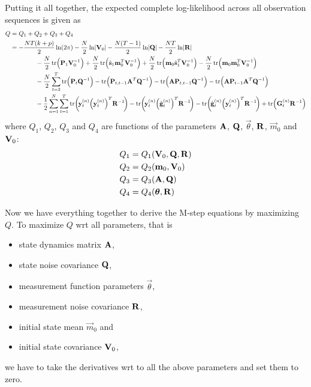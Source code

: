	Putting it all together, the expected complete log-likelihood across all observation sequences is given as
	\begin{align*}
		Q
			&= Q_1 + Q_2 + Q_3 + Q_4 \\
			&= -\frac{NT(k + p)}{2} \ln(2\pi) - \frac{N}{2} \ln \lvert \mat{V}_0 \rvert - \frac{N(T - 1)}{2} \ln \lvert \mat{Q} \rvert - \frac{NT}{2} \ln \lvert \mat{R} \rvert \\
				&\qquad\qquad -\frac{N}{2} \tr\!\Big( \mat{P}_1 \mat{V}_0^{-1} \Big) + \frac{N}{2} \tr\!\Big( \hat{\vec{s}}_1 \vec{m}_0^T \mat{V}_0^{-1} \Big) + \frac{N}{2} \tr\!\Big( \vec{m}_0 \hat{\vec{s}}_1^T \mat{V}_0^{-1} \Big) - \frac{N}{2} \tr\!\Big(\vec{m}_0 \vec{m}_0^T \mat{V}_0^{-1} \Big) \\
				&\qquad\qquad -\frac{N}{2} \sum_{t = 2}^{T} \tr\!\Big( \mat{P}_t \mat{Q}^{-1} \Big) - \tr\!\Big( \mat{P}_{t, t - 1} \mat{A}^T \mat{Q}^{-1} \Big) - \tr\!\Big( \mat{A} \mat{P}_{t, t - 1} \mat{Q}^{-1} \Big) - \tr\!\Big( \mat{A} \mat{P}_{t - 1} \mat{A}^T \mat{Q}^{-1} \Big) \\
				&\qquad\qquad -\frac{1}{2} \sum_{n = 1}^{N} \sum_{t = 1}^{T} \tr\!\bigg(\! \vec{y}_t^{(n)} \Big(\vec{y}_t^{(n)}\Big)^T \mat{R}^{-1} \!\bigg) - \tr\!\bigg(\! \vec{y}_t^{(n)} \Big(\hat{\vec{g}}_t^{(n)}\Big)^T \mat{R}^{-1} \!\bigg) - \tr\!\bigg(\! \hat{\vec{g}}_t^{(n)} \Big(\vec{y}_t^{(n)}\Big)^T \mat{R}^{-1} \!\bigg) + \tr\!\Big( \mat{G}_t^{(n)} \mat{R}^{-1} \Big)
	\end{align*}
	where \( Q_1 \), \( Q_2 \), \( Q_3 \) and \( Q_4 \) are functions of the parameters \( \boldsymbol{\mathrm{A}} \), \( \boldsymbol{\mathrm{Q}} \), \( \vec{\theta} \), \( \boldsymbol{\mathrm{R}} \), \( \vec{m}_0 \) and \( \boldsymbol{\mathrm{V}}_0 \):
	\begin{align*}
		Q_1 & = Q_1(\boldsymbol{\mathrm{V}}_0, \boldsymbol{\mathrm{Q}}, \boldsymbol{\mathrm{R}}) \\
		Q_2 & = Q_2(\boldsymbol{\mathrm{m}}_0, \boldsymbol{\mathrm{V}}_0)        \\
		Q_3 & = Q_3(\boldsymbol{\mathrm{A}}, \boldsymbol{\mathrm{Q}})            \\
		Q_4 & = Q_4(\boldsymbol{\mathrm{\theta}}, \boldsymbol{\mathrm{R}})
	\end{align*}

	Now we have everything together to derive the M-step equations by maximizing \(Q\). To maximize \(Q\) \ac{wrt} all parameters, that is
	\begin{itemize}
		\item state dynamics matrix \(\boldsymbol{\mathrm{A}}\),
		\item state noise covariance \(\boldsymbol{\mathrm{Q}}\),
		\item measurement function parameters \(\vec{\theta}\),
		\item measurement noise covariance \(\boldsymbol{\mathrm{R}}\),
		\item initial state mean \(\vec{m}_0\) and
		\item initial state covariance \(\boldsymbol{\mathrm{V}}_0\),
	\end{itemize}
	we have to take the derivatives \ac{wrt} to all the above parameters and set them to zero.

